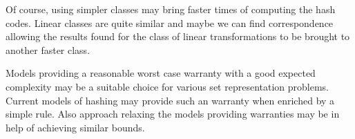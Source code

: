 Of course, using simpler classes may bring faster times of computing the hash codes. Linear classes are quite similar and maybe we can find correspondence allowing the results found for the class of linear transformations to be brought to another faster class.

Models providing a reasonable worst case warranty with a good expected complexity may be a suitable choice for various set representation problems. Current models of hashing may provide such an warranty when enriched by a simple rule. Also approach relaxing the models providing warranties may be in help of achieving similar bounds.
